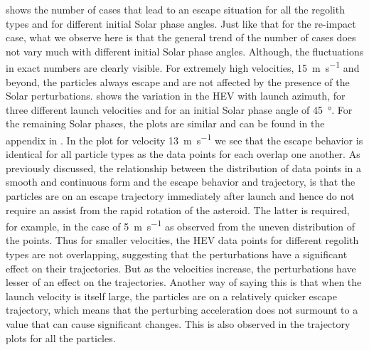  shows the number of cases that lead to an escape situation for all the regolith types and for different initial Solar phase angles. Just like that for the re-impact case, what we observe here is that the general trend of the number of cases does not vary much with different initial Solar phase angles. Although, the fluctuations in exact numbers are clearly visible. For extremely high velocities, \SI{15}{\metre\per\second} and beyond, the particles always escape and are not affected by the presence of the Solar perturbations.
%
\newline\newline
%
 shows the variation in the \gls{HEV} with launch azimuth, for three different launch velocities and for an initial Solar phase angle of \SI{45}{\degree}. For the remaining Solar phases, the plots are similar and can be found in the appendix in . In the plot for velocity \SI{13}{\metre\per\second} we see that the escape behavior is identical for all particle types as the data points for each overlap one another. As previously discussed, the relationship between the distribution of data points in a smooth and continuous form and the escape behavior and trajectory, is that the particles are on an escape trajectory immediately after launch and hence do not require an assist from the rapid rotation of the asteroid. The latter is required, for example, in the case of \SI{5}{\metre\per\second} as observed from the uneven distribution of the points. Thus for smaller velocities, the \gls{HEV} data points for different regolith types are not overlapping, suggesting that the perturbations have a significant effect on their trajectories. But as the velocities increase, the perturbations have lesser of an effect on the trajectories. Another way of saying this is that when the launch velocity is itself large, the particles are on a relatively quicker escape trajectory, which means that the perturbing acceleration does not surmount to a value that can cause significant changes. This is also observed in the trajectory plots for all the particles.
